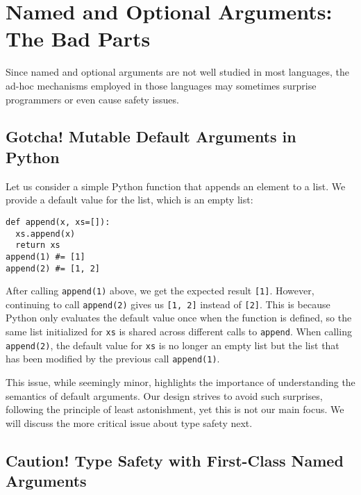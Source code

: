 \section{Named and Optional Arguments: The Bad Parts}

Since named and optional arguments are not well studied in most languages, the
ad-hoc mechanisms employed in those languages may sometimes surprise programmers
or even cause safety issues.

\subsection{Gotcha! Mutable Default Arguments in Python} \label{sec:mut}

Let us consider a simple Python function that appends an element to a list. We
provide a default value for the list, which is an empty list:

\begin{multicols}{2}
\begin{lstlisting}[language={[3]Python}]
def append(x, xs=[]):
  xs.append(x)
  return xs
append(1) #= [1]
append(2) #= [1, 2]
\end{lstlisting}
\end{multicols}

\noindent
After calling \lstinline{append(1)} above, we get the expected result
\lstinline{[1]}. However, continuing to call \lstinline{append(2)} gives us
\lstinline{[1, 2]} instead of \lstinline{[2]}. This is because Python only
evaluates the default value once when the function is defined, so the same list
initialized for \lstinline{xs} is shared across different calls to
\lstinline{append}. When calling \lstinline{append(2)}, the default value for
\lstinline{xs} is no longer an empty list but the list that has been modified by
the previous call \lstinline{append(1)}.

This issue, while seemingly minor, highlights the importance of understanding
the semantics of default arguments. Our design strives to avoid such surprises,
following the principle of least astonishment, yet this is not our main focus.
We will discuss the more critical issue about type safety next.

\subsection{Caution! Type Safety with First-Class Named Arguments} \label{sec:mypy}

